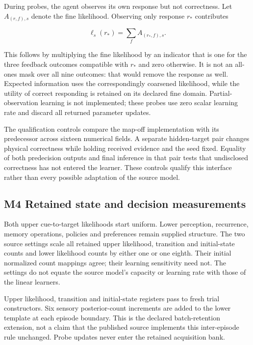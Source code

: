 \documentclass[
  american,
  11pt,
  letterpaper,
]{article}
\begin{document}
During probes, the agent observes its own response but not correctness. Let \(A_{(r,f),s}\) denote the fine likelihood. Observing only response \(r_*\) contributes

\begin{equation}
\ell_s(r_*)=\sum_f A_{(r_*,f),s}.
\tag{M2}
\end{equation}

This follows by multiplying the fine likelihood by an indicator that is one for the three feedback outcomes compatible with \(r_*\) and zero otherwise. It is not an all-ones mask over all nine outcomes: that would remove the response as well. Expected information uses the correspondingly coarsened likelihood, while the utility of correct responding is retained on its declared fine domain. Partial-observation learning is not implemented; these probes use zero scalar learning rate and discard all returned parameter updates.

The qualification controls compare the map-off implementation with its predecessor across sixteen numerical fields. A separate hidden-target pair changes physical correctness while holding received evidence and the seed fixed. Equality of both predecision outputs and final inference in that pair tests that undisclosed correctness has not entered the learner. These controls qualify this interface rather than every possible adaptation of the source model.

\subsection{M4 Retained state and decision measurements}\label{m4-retained-state-and-decision-measurements}

Both upper cue-to-target likelihoods start uniform. Lower perception, recurrence, memory operations, policies and preferences remain supplied structure. The two source settings scale all retained upper likelihood, transition and initial-state counts and lower likelihood counts by either one or one eighth. Their initial normalized count mappings agree; their learning sensitivity need not. The settings do not equate the source model's capacity or learning rate with those of the linear learners.

Upper likelihood, transition and initial-state registers pass to fresh trial constructors. Six sensory posterior-count increments are added to the lower template at each episode boundary. This is the declared batch-retention extension, not a claim that the published source implements this inter-episode rule unchanged. Probe updates never enter the retained acquisition bank.
\end{document}
